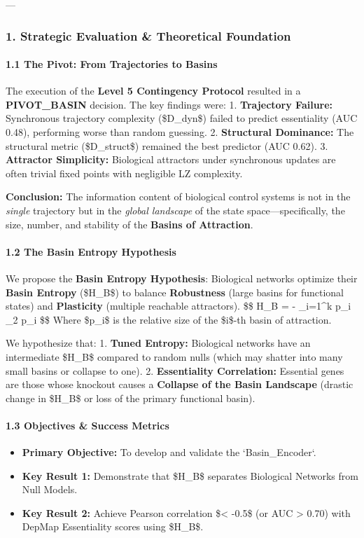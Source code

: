 \documentclass{article}
\begin{document}
---

\subsubsection{1. Strategic Evaluation \& Theoretical Foundation}

\paragraph{1.1 The Pivot: From Trajectories to Basins}
The execution of the \textbf{Level 5 Contingency Protocol} resulted in a \textbf{PIVOT\_BASIN} decision. The key findings were:
1.  \textbf{Trajectory Failure:} Synchronous trajectory complexity (\$D\_{dyn}\$) failed to predict essentiality (AUC 0.48), performing worse than random guessing.
2.  \textbf{Structural Dominance:} The structural metric (\$D\_{struct}\$) remained the best predictor (AUC 0.62).
3.  \textbf{Attractor Simplicity:} Biological attractors under synchronous updates are often trivial fixed points with negligible LZ complexity.

\textbf{Conclusion:} The information content of biological control systems is not in the \textit{single} trajectory but in the \textit{global landscape} of the state space—specifically, the size, number, and stability of the \textbf{Basins of Attraction}.

\paragraph{1.2 The Basin Entropy Hypothesis}
We propose the \textbf{Basin Entropy Hypothesis}:
Biological networks optimize their \textbf{Basin Entropy} (\$H\_B\$) to balance \textbf{Robustness} (large basins for functional states) and \textbf{Plasticity} (multiple reachable attractors).
\$\$ H\_B = - \sum\_{i=1}^{k} p\_i \log\_2 p\_i \$\$
Where \$p\_i\$ is the relative size of the \$i\$-th basin of attraction.

We hypothesize that:
1.  \textbf{Tuned Entropy:} Biological networks have an intermediate \$H\_B\$ compared to random nulls (which may shatter into many small basins or collapse to one).
2.  \textbf{Essentiality Correlation:} Essential genes are those whose knockout causes a \textbf{Collapse of the Basin Landscape} (drastic change in \$H\_B\$ or loss of the primary functional basin).

\paragraph{1.3 Objectives \& Success Metrics}
\begin{itemize}
\item   \textbf{Primary Objective:} To develop and validate the `Basin\_Encoder`.
\item   \textbf{Key Result 1:} Demonstrate that \$H\_B\$ separates Biological Networks from Null Models.
\item   \textbf{Key Result 2:} Achieve Pearson correlation \$\rho < -0.5\$ (or AUC > 0.70) with DepMap Essentiality scores using \$\Delta H\_B\$.
\end{itemize}
\end{document}
